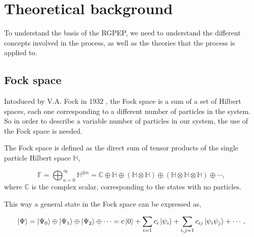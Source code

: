 \documentclass[11pt,a4paper,twoside,pdf]{article}
\numberwithin{equation}{section}
\begin{document}
\section{Theoretical background} \label{sec:theoretical_background}

To understand the basis of the RGPEP, we need to understand the different
concepts involved in the process, as well as the theories that the process is
applied to.  

\subsection{Fock space} \label{sec:fock_space}

Intoduced by V.A. Fock in 1932 \cite{1932ZPhy...75..622F}, the Fock space is a sum 
of a set of Hilbert spaces, each one corresponding to a different number of 
particles in the system. So in order to describe a variable number of particles in our 
system, the use of the Fock space is needed.

The Fock space is defined as the direct sum of tensor products of the single 
particle Hilbert space $\mathbb{H}$,

\begin{equation}
    \mathbb{F} = \bigoplus_{n=0}^{\infty}  \mathbb{H}^{\otimes n} = 
    \mathbb{C} \oplus \mathbb{H} \oplus (\mathbb{H} \otimes \mathbb{H}) 
    \oplus (\mathbb{H} \otimes \mathbb{H}\otimes \mathbb{H}) \oplus \cdots,
\end{equation}
where $\mathbb{C}$ is the complex scalar, corresponding to the states with no particles.

This way a general state in the Fock space can be expressed as,

\begin{equation}
    \ket{\Psi} = \ket{\Psi_0} \oplus \ket{\Psi_1} \oplus
    \ket{\Psi_2} \oplus \cdots = c \ket{0} + \sum_{i=1}c_i \ket{\psi_i} +
    \sum_{i,j=1}c_{ij} \ket{\psi_i \psi_j} + \cdots,
\end{equation}
\end{document}
